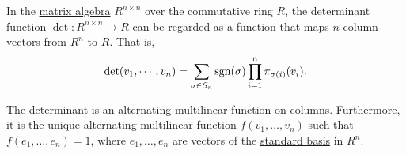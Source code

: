\begin{proposition}\label{thm:determinant_on_columns}
  In the \hyperref[thm:matrix_algebra]{matrix algebra} \( R^{n \times n} \) over the commutative ring \( R \), the determinant function \( \det: R^{n \times n} \to R \) can be regarded as a function that maps \( n \) column vectors from \( R^n \) to \( R \). That is,
  \begin{equation}\label{eq:thm:determinant_on_columns}
    \det(v_1, \cdots, v_n) = \sum_{\sigma \in S_n} \operatorname{sgn}(\sigma) \prod_{i=1}^n \pi_{\sigma(i)} (v_i).
  \end{equation}

  The determinant is an \hyperref[def:alternating_function]{alternating} \hyperref[def:multilinear_function]{multilinear function} on columns. Furthermore, it is the unique alternating multilinear function \( f(v_1, \ldots, v_n) \) such that \( f(e_1, \ldots, e_n) = 1 \), where \( e_1, \ldots, e_n \) are vectors of the \hyperref[def:sequence_space]{standard basis} in \( R^n \).
\end{proposition}
